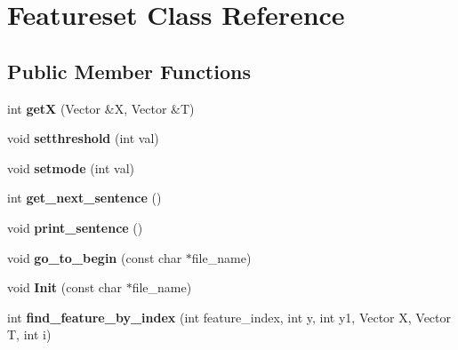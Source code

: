 \hypertarget{classFeatureset}{
\section{Featureset Class Reference}
\label{classFeatureset}
}
\subsection*{Public Member Functions}
\begin{DoxyCompactItemize}
\item 
\hypertarget{classFeatureset_a4d7ff5a7957afaa1f53b4667546cd897}{
int {\bfseries getX} (Vector \&X, Vector \&T)}
\label{classFeatureset_a4d7ff5a7957afaa1f53b4667546cd897}

\item 
\hypertarget{classFeatureset_ae9fa5e5d418650c7e44236e3de95ee24}{
void {\bfseries setthreshold} (int val)}
\label{classFeatureset_ae9fa5e5d418650c7e44236e3de95ee24}

\item 
\hypertarget{classFeatureset_aa82dca9cdf0d88d7bcea653a81a4bcdc}{
void {\bfseries setmode} (int val)}
\label{classFeatureset_aa82dca9cdf0d88d7bcea653a81a4bcdc}

\item 
\hypertarget{classFeatureset_a52e22c0861a8a36ac85fad4abf8b6094}{
int {\bfseries get\_\-next\_\-sentence} ()}
\label{classFeatureset_a52e22c0861a8a36ac85fad4abf8b6094}

\item 
\hypertarget{classFeatureset_a65e3b9b61756c32bdad996f70b0a6985}{
void {\bfseries print\_\-sentence} ()}
\label{classFeatureset_a65e3b9b61756c32bdad996f70b0a6985}

\item 
\hypertarget{classFeatureset_a554f3bdd0ac67273dfc0ce33ecfed83d}{
void {\bfseries go\_\-to\_\-begin} (const char $\ast$file\_\-name)}
\label{classFeatureset_a554f3bdd0ac67273dfc0ce33ecfed83d}

\item 
\hypertarget{classFeatureset_a18d8d64dd338db607ed4744517b262a0}{
void {\bfseries Init} (const char $\ast$file\_\-name)}
\label{classFeatureset_a18d8d64dd338db607ed4744517b262a0}

\item 
\hypertarget{classFeatureset_a01350406c96bb1ccc1d23bb88c2f2cb9}{
int {\bfseries find\_\-feature\_\-by\_\-index} (int feature\_\-index, int y, int y1, Vector X, Vector T, int i)}
\label{classFeatureset_a01350406c96bb1ccc1d23bb88c2f2cb9}


\end{DoxyCompactItemize}
